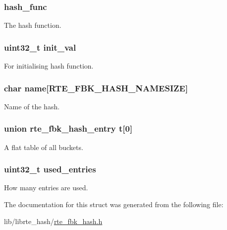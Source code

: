 \subsubsection[{hash\+\_\+func}]{ hash\+\_\+func}\label{structrte__fbk__hash__table_a69f0a1b6157a850ab077f407294b0669}
The hash function. \hypertarget{structrte__fbk__hash__table_aa9c51f653df7b8a657a31d12ce9a214b}{}
\subsubsection[{init\+\_\+val}]{\setlength{\rightskip}{0pt plus 5cm}uint32\+\_\+t init\+\_\+val}\label{structrte__fbk__hash__table_aa9c51f653df7b8a657a31d12ce9a214b}
For initialising hash function. \hypertarget{structrte__fbk__hash__table_ac768b4e31109e8a60dc7a326d428f32a}{}
\subsubsection[{name}]{\setlength{\rightskip}{0pt plus 5cm}char name\mbox{[}{\bf R\+T\+E\+\_\+\+F\+B\+K\+\_\+\+H\+A\+S\+H\+\_\+\+N\+A\+M\+E\+S\+I\+Z\+E}\mbox{]}}\label{structrte__fbk__hash__table_ac768b4e31109e8a60dc7a326d428f32a}
Name of the hash. \hypertarget{structrte__fbk__hash__table_aaa3d527a459f02296bc29530f1c13319}{}
\subsubsection[{t}]{\setlength{\rightskip}{0pt plus 5cm}union {\bf rte\+\_\+fbk\+\_\+hash\+\_\+entry} t\mbox{[}0\mbox{]}}\label{structrte__fbk__hash__table_aaa3d527a459f02296bc29530f1c13319}
A flat table of all buckets. \hypertarget{structrte__fbk__hash__table_aa22453ac46ce8c14513d6bc3f2097f14}{}
\subsubsection[{used\+\_\+entries}]{\setlength{\rightskip}{0pt plus 5cm}uint32\+\_\+t used\+\_\+entries}\label{structrte__fbk__hash__table_aa22453ac46ce8c14513d6bc3f2097f14}
How many entries are used. 

The documentation for this struct was generated from the following file\+:\begin{DoxyCompactItemize}
\item 
lib/librte\+\_\+hash/\hyperlink{rte__fbk__hash_8h}{rte\+\_\+fbk\+\_\+hash.\+h}\end{DoxyCompactItemize}
